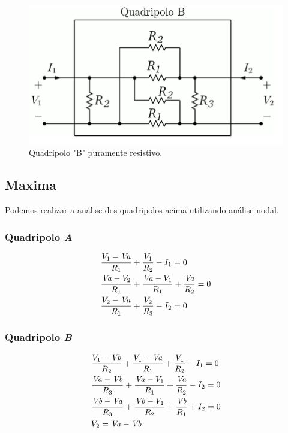 \documentclass[12pt,twoside, a4paper, twocolumn]{article}
\begin{document}
\begin{figure}[h]
    \centering
    \includegraphics[width=1\columnwidth]{images/quadripolob.png}
    \caption{Quadripolo "B" puramente resistivo.}
\end{figure}




\pagebreak
\subsection{Maxima}




Podemos realizar a análise dos quadripolos acima utilizando análise nodal.


\subsubsection{Quadripolo \emph{A}}


\begin{equation}
    \begin{aligned}
         & {{V_{1}-{\it Va}}\over{R_{1}}}+{{V_{1}}\over{R_{2}}}-I_{1}=0                              \\
         & {{{\it Va}-V_{2}}\over{R_{1}}}+{{{\it Va}-V_{1}}\over{R_{1}}}+{{ {\it Va}}\over{R_{2}}}=0 \\
         & {{V_{2}-{\it Va}}\over{R_{1}}}+{{V_{2}}\over{R_{3}}}-I_{2}=0
    \end{aligned}
\end{equation}


\subsubsection{Quadripolo \emph{B}}


\begin{equation}
    \begin{aligned}
         & {{V_{1}-{\it Vb}}\over{R_{2}}}+{{V_{1}-{\it Va}}\over{R_{1}}}+{{ V_{1}}\over{R_{2}}}-I_{1}=0       \\
         & {{{\it Va}-{\it Vb}}\over{R_{3}}}+{{{\it Va}-V_{1}}\over{R_{1}}}+{{ {\it Va}}\over{R_{2}}}-I_{2}=0 \\
         & {{{\it Vb}-{\it Va}}\over{R_{3}}}+{{{\it Vb}-V_{1}}\over{R_{2}}}+{{ {\it Vb}}\over{R_{1}}}+I_{2}=0 \\
         & V_{2}={\it Va}-{\it Vb}
    \end{aligned}
\end{equation}
\end{document}
